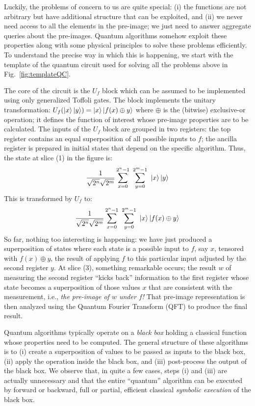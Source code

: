 \documentclass{article}
\begin{document}
Luckily, the problems of concern to us are quite special: (i) the
functions are not arbitrary but have additional structure that can be
exploited, and (ii) we never need access to all the elements in the
pre-image; we just need to answer aggregate queries about the
pre-images. Quantum algorithms somehow exploit these properties along
with some physical principles to solve these problems efficiently. To
understand the precise way in which this is happening, we start with
the template of the quantum circuit used for solving all the problems
above in Fig.~\ref{fig:templateQC}.

The core of the circuit is the $U_f$ block which can be assumed to be
implemented using only generalized Toffoli gates. The block implements
the unitary transformation: $U_f(\ket{x}\ket{y}) = \ket{x}\ket{f(x)
  \oplus y}$ where $\oplus$ is the (bitwise) exclusive-or operation;
it defines the function of interest whose pre-image properties are to
be calculated. The inputs of the $U_f$ block are grouped in two
registers: the top register contains an equal superposition of all
possible inputs to $f$; the ancilla register is prepared in initial
states that depend on the specific algorithm. Thus, the state at slice
(1) in the figure is:
  \[
  \frac{1}{\sqrt{2^n}\sqrt{2^m}}\sum_{x=0}^{2^n-1} ~\sum_{y=0}^{2^m-1} ~\ket{x}\ket{y}
  \]
This is transformed by $U_f$ to:
  \[
  \frac{1}{\sqrt{2^n}\sqrt{2^m}}
  \sum_{x=0}^{2^n-1} ~\sum_{y=0}^{2^m-1} ~\ket{x}\ket{f(x)\oplus y}
  \]
So far, nothing too interesting is happening: we have just produced a
superposition of states where each state is a possible input to $f$,
say $x$, tensored with $f(x) \oplus y$, the result of applying $f$ to
this particular input adjusted by the second register $y$. At slice
(3), something remarkable occurs; the result $w$ of measuring the
second register ``kicks back'' information to the first register whose
state becomes a superposition of those values $x$ that are consistent
with the measurement, i.e., \emph{the pre-image of $w$ under $f$!}
That pre-image representation is then analyzed using the Quantum
Fourier Transform (QFT) to produce the final result.

Quantum algorithms typically operate on a \emph{black box} holding a
classical function whose properties need to be computed. The general
structure of these algorithms is to (i) create a superposition of
values to be passed as inputs to the black box, (ii) apply the
operation inside the black box, and (iii) post-process the output of
the black box. We observe that, in quite a few cases, steps (i) and
(iii) are actually unnecessary and that the entire ``quantum''
algorithm can be executed by forward or backward, full or partial,
efficient classical \emph{symbolic execution} of the black box.
\end{document}
